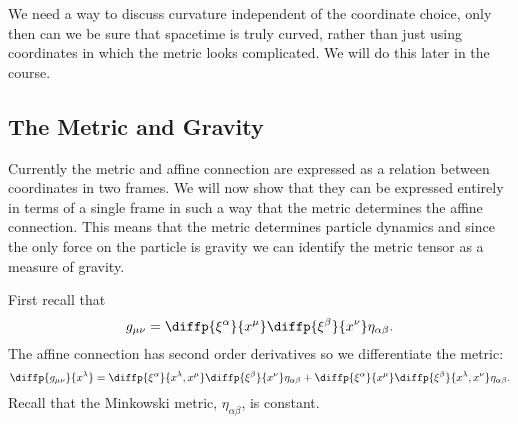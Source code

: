 \documentclass[fleqn]{NotesClass}
\begin{document}
    We need a way to discuss curvature independent of the coordinate choice, only then can we be sure that spacetime is truly curved, rather than just using coordinates in which the metric looks complicated.
    We will do this later in the course.
    
    \subsection{The Metric and Gravity}
    Currently the metric and affine connection are expressed as a relation between coordinates in two frames.
    We will now show that they can be expressed entirely in terms of a single frame in such a way that the metric determines the affine connection.
    This means that the metric determines particle dynamics and since the only force on the particle is gravity we can identify the metric tensor as a measure of gravity.
    
    First recall that
    \begin{equation}
        g_{\mu\nu} = \diffp{\xi^\alpha}{x^\mu}\diffp{\xi^\beta}{x^\nu}\eta_{\alpha\beta}.
    \end{equation}
    The affine connection has second order derivatives so we differentiate the metric:
    \begin{equation}
        \diffp{g_{\mu\nu}}{x^\lambda} = \diffp{\xi^\alpha}{x^\lambda, x^\mu} \diffp{\xi^\beta}{x^\nu} \eta_{\alpha\beta} + \diffp{\xi^\alpha}{x^\mu}\diffp{\xi^\beta}{x^\lambda, x^\nu} \eta_{\alpha\beta}.
    \end{equation}
    Recall that the Minkowski metric, \(\eta_{\alpha\beta}\), is constant.
    
\end{document}

